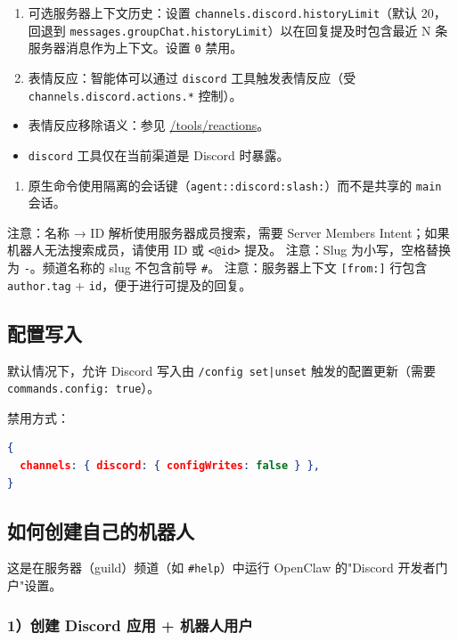 \begin{enumerate}
  \item 可选服务器上下文历史：设置 \texttt{channels.discord.historyLimit}（默认 20，回退到 \texttt{messages.groupChat.historyLimit}）以在回复提及时包含最近 N 条服务器消息作为上下文。设置 \texttt{0} 禁用。
  \item 表情反应：智能体可以通过 \texttt{discord} 工具触发表情反应（受 \texttt{channels.discord.actions.*} 控制）。
\end{enumerate}

\begin{itemize}
  \item 表情反应移除语义：参见 \href{/tools/reactions}{/tools/reactions}。
  \item \texttt{discord} 工具仅在当前渠道是 Discord 时暴露。
\end{itemize}

\begin{enumerate}
  \item 原生命令使用隔离的会话键（\texttt{agent::discord:slash:}）而不是共享的 \texttt{main} 会话。
\end{enumerate}


注意：名称 → ID 解析使用服务器成员搜索，需要 Server Members Intent；如果机器人无法搜索成员，请使用 ID 或 \texttt{<@id>} 提及。
注意：Slug 为小写，空格替换为 \texttt{-}。频道名称的 slug 不包含前导 \texttt{\#}。
注意：服务器上下文 \texttt{[from:]} 行包含 \texttt{author.tag} + \texttt{id}，便于进行可提及的回复。

\subsection{配置写入}


默认情况下，允许 Discord 写入由 \texttt{/config set|unset} 触发的配置更新（需要 \texttt{commands.config: true}）。

禁用方式：

\begin{lstlisting}[language=json]
{
  channels: { discord: { configWrites: false } },
}
\end{lstlisting}


\subsection{如何创建自己的机器人}


这是在服务器（guild）频道（如 \texttt{\#help}）中运行 OpenClaw 的"Discord 开发者门户"设置。

\subsubsection{1）创建 Discord 应用 + 机器人用户}


